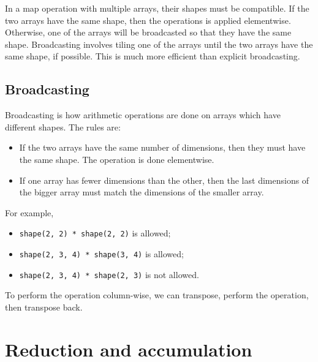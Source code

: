 \documentclass[a4paper, openany]{memoir}
\begin{document}
    In a map operation with multiple arrays, their shapes must be compatible. If the two arrays have the same shape, then the operations is applied elementwise. Otherwise, one of the arrays will be broadcasted so that they have the same shape. Broadcasting involves tiling one of the arrays until the two arrays have the same shape, if possible. This is much more efficient than explicit broadcasting.

    \subsection{Broadcasting}
    Broadcasting is how arithmetic operations are done on arrays which have different shapes. The rules are:
    \begin{itemize}
        \item If the two arrays have the same number of dimensions, then they must have the same shape. The operation is done elementwise.
        \item If one array has fewer dimensions than the other, then the last dimensions of the bigger array must match the dimensions of the smaller array.
    \end{itemize}
    For example,
    \begin{itemize}
        \item \texttt{shape(2, 2) * shape(2, 2)} is allowed;
        \item \texttt{shape(2, 3, 4) * shape(3, 4)} is allowed;
        \item \texttt{shape(2, 3, 4) * shape(2, 3)} is not allowed.
    \end{itemize}
    To perform the operation column-wise, we can transpose, perform the operation, then transpose back.

    \section{Reduction and accumulation}
\end{document}

